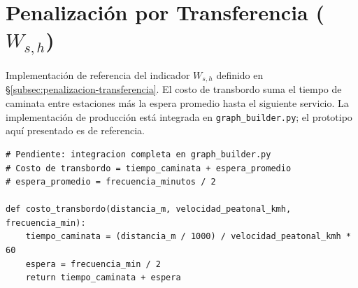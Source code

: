 \section{Penalización por Transferencia \texorpdfstring{($W_{s,h}$)}{(W)}}
\label{anx:impl-transferencia}

Implementación de referencia del indicador $W_{s,h}$ definido en
§\ref{subsec:penalizacion-transferencia}. El costo de transbordo suma el tiempo
de caminata entre estaciones más la espera promedio hasta el siguiente servicio.
La implementación de producción está integrada en \texttt{graph\_builder.py}; el
prototipo aquí presentado es de referencia.

\begin{lstlisting}[style=estiloPython,
  caption={Cálculo de la Penalización por Transferencia $W_{s,h}$ (prototipo).},
  label={lst:transferencia}]
# Pendiente: integracion completa en graph_builder.py
# Costo de transbordo = tiempo_caminata + espera_promedio
# espera_promedio = frecuencia_minutos / 2

def costo_transbordo(distancia_m, velocidad_peatonal_kmh, frecuencia_min):
    tiempo_caminata = (distancia_m / 1000) / velocidad_peatonal_kmh * 60
    espera = frecuencia_min / 2
    return tiempo_caminata + espera
\end{lstlisting}

